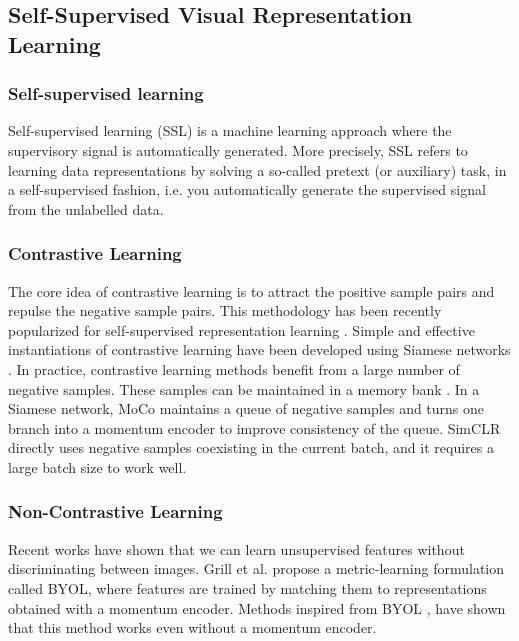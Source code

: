 \documentclass[letterpaper, 12pt]{book}
\theoremstyle{definition}
\theoremstyle{definition}
\theoremstyle{definition}
\theoremstyle{definition}
\theoremstyle{definition}
\begin{document}
\subsection{Self-Supervised Visual Representation Learning \label{org4fa78d9}}
\label{sec:orgff19362}

\subsubsection{Self-supervised learning}
\label{sec:orgd727328}
Self-supervised learning (SSL) is a machine learning approach where the
supervisory signal is automatically generated. More precisely, SSL refers to
learning data representations by solving a so-called pretext (or auxiliary)
task, in a self-supervised fashion, i.e. you automatically generate the
supervised signal from the unlabelled data.

\subsubsection{Contrastive Learning}
\label{sec:orge56af60}
The core idea of contrastive learning is to attract the positive sample pairs
and repulse the negative sample pairs. This methodology has been recently
popularized for self-supervised representation learning \cite{Wu2018}. Simple
and effective instantiations of contrastive learning have been developed using
Siamese networks \cite{He2019,Chen2020a,Zbontar2021}. In practice,
contrastive learning methods benefit from a large number of negative
samples. These samples can be maintained in a memory bank \cite{Wu2018}. In a
Siamese network, MoCo \cite{He2019} maintains a queue of negative samples and
turns one branch into a momentum encoder to improve consistency of the
queue. SimCLR \cite{Chen2020a} directly uses negative samples coexisting in the
current batch, and it requires a large batch size to work well.

\subsubsection{Non-Contrastive Learning}
\label{sec:orgfd6e37a}
Recent works have shown that we can learn unsupervised features without
discriminating between images. Grill et al. \cite{Grill2020} propose a
metric-learning formulation called BYOL, where features are trained by matching
them to representations obtained with a momentum encoder. Methods inspired from
BYOL \cite{Chen2020,Caron2021}, have shown that this method works even without a
momentum encoder.
\end{document}
